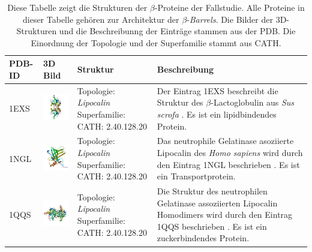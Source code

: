 \documentclass{article}
\begin{document}
\begin{table}
\begin{center}
\caption{Diese Tabelle zeigt die Strukturen der $\beta$-Proteine der Fallstudie. Alle Proteine in dieser Tabelle geh\"oren zur Architektur der $\beta$-\textit{Barrels}. Die Bilder der 3D-Strukturen und die Beschreibunng der Eintr\"age stammen aus der PDB. Die Einordnung der Topologie und der Superfamilie stammt aus CATH. }
\begin{tabular}{ | C{9mm} | C{30mm} | C{29mm} | C{38mm} | }
\hline
PDB-ID & 3D Bild & Struktur & Beschreibung \\ \hline
1EXS  & \includegraphics[width=30mm, trim= -10 -5 -5 -10]{1EXS_bio_r_500.jpg} & Topologie: \newline \textit{Lipocalin} \newline Superfamilie: CATH: 2.40.128.20 & Der Eintrag 1EXS beschreibt die Struktur des $\beta$-Lactoglobulin aus \textit{Sus scrofa} \cite{1exs}. Es ist ein lipidbindendes Protein. \\ \hline
1NGL  & \includegraphics[width=30mm, trim= -10 -5 -5 -10]{1NGL_asym_r_500.jpg} & Topologie: \newline \textit{Lipocalin} \newline Superfamilie: CATH: 2.40.128.20  & Das neutrophile Gelatinase asoziierte Lipocalin des \textit{Homo sapiens} wird durch den Eintrag 1NGL beschrieben \cite{1ngl}. Es ist ein Transportprotein. \\ \hline
1QQS  & \includegraphics[width=30mm, trim= -10 -5 -5 -10]{1QQS_bio_r_500.jpg} & Topologie: \newline \textit{Lipocalin} \newline Superfamilie: CATH: 2.40.128.20  & Die Struktur des neutrophilen Gelatinase assoziierten Lipocalin Homodimers wird durch den Eintrag 1QQS beschrieben \cite{1qqs}. Es ist ein zuckerbindendes Protein.  \\ \hline

\end{tabular}
\end{center}
\end{table}
\end{document}
